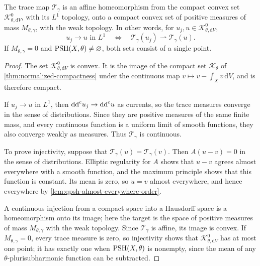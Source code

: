 \begin{theorem}\label{thm:gaud-trace-homeomorphism}
The trace map $\mathcal T_\gamma$ is an affine homeomorphism from the compact convex set $\mathcal K^0_{\theta,\mathrm{d}V}$, with its $L^1$ topology, onto a compact convex set of positive measures of mass $M_{\theta,\gamma}$, with the weak topology. In other words, for $u_j,u\in\mathcal K^0_{\theta,\mathrm{d}V}$,
\[
 u_j\longrightarrow u\text{ in }L^1
 \quad\Longleftrightarrow\quad
 \mathcal T_\gamma(u_j)\rightharpoonup\mathcal T_\gamma(u).
\]
If $M_{\theta,\gamma}=0$ and $\mathrm{PSH}(X,\theta)\ne\varnothing$, both sets consist of a single point.
\end{theorem}
\begin{proof}
The set $\mathcal K^0_{\theta,\mathrm{d}V}$ is convex. It is the image of the compact set $\mathcal K_\theta$ of \cref{thm:normalized-compactness} under the continuous map $v\mapsto v-\int_Xv\,\mathrm{d}V$, and is therefore compact.

If $u_j\to u$ in $L^1$, then $\mathrm{dd}^{\mathrm{c}} u_j\to\mathrm{dd}^{\mathrm{c}} u$ as currents, so the trace measures converge in the sense of distributions. Since they are positive measures of the same finite mass, and every continuous function is a uniform limit of smooth functions, they also converge weakly as measures. Thus $\mathcal T_\gamma$ is continuous.

To prove injectivity, suppose that $\mathcal T_\gamma(u)=\mathcal T_\gamma(v)$. Then $A(u-v)=0$ in the sense of distributions. Elliptic regularity for $A$ shows that $u-v$ agrees almost everywhere with a smooth function, and the maximum principle shows that this function is constant. Its mean is zero, so $u=v$ almost everywhere, and hence everywhere by \cref{lem:qpsh-almost-everywhere-order}.

A continuous injection from a compact space into a Hausdorff space is a homeomorphism onto its image; here the target is the space of positive measures of mass $M_{\theta,\gamma}$ with the weak topology. Since $\mathcal T_\gamma$ is affine, its image is convex. If $M_{\theta,\gamma}=0$, every trace measure is zero, so injectivity shows that $\mathcal K^0_{\theta,\mathrm{d}V}$ has at most one point; it has exactly one when $\mathrm{PSH}(X,\theta)$ is nonempty, since the mean of any $\theta$-plurisubharmonic function can be subtracted.
\end{proof}

